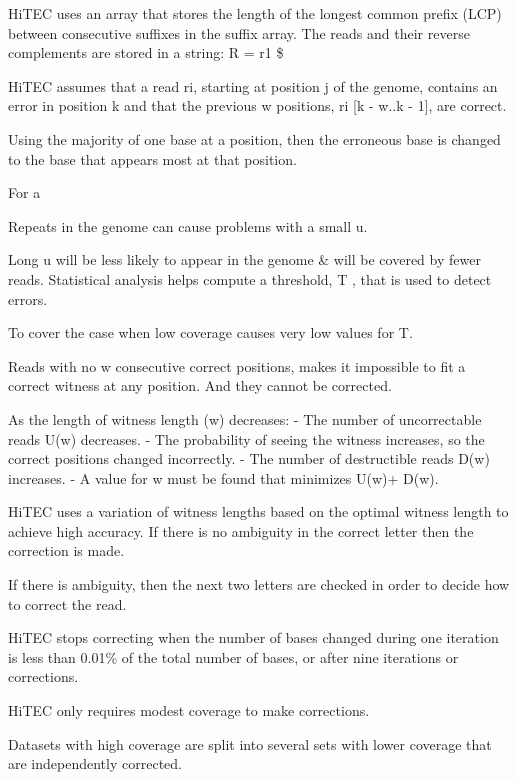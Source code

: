 \documentclass{llncs}
\begin{document}
HiTEC uses an array that stores the length of the longest common prefix (LCP) between consecutive suffixes in the suffix array.
The reads and their reverse complements are stored in a string:
R = r1 \$ %

HiTEC assumes that a read ri, starting at position j of the genome, contains an error in position k and that the previous w positions, ri [k - w..k - 1], are correct. 

Using the majority of one base at a position, then the erroneous base is changed to the base that appears most at that position. 

For a %

Repeats in the genome can cause problems with a small u.

Long u will be less likely to appear in the genome \& will be covered by fewer reads.
Statistical analysis helps compute a threshold, T , that is used to detect errors. 

To cover the case when low coverage causes very low values for T.

Reads with no w consecutive correct positions, makes it impossible to fit a correct witness at any position. And they cannot be corrected.

As the length of witness length (w) decreases:
- The number of uncorrectable reads U(w) decreases.
- The probability of seeing the witness increases, so the correct positions changed incorrectly. 
- The number of destructible reads D(w) increases.
- A value for w must be found that minimizes U(w)+ D(w). 

HiTEC uses a variation of witness lengths based on the optimal witness length to achieve high accuracy.
If there is no ambiguity in the correct letter then the correction is made.

If there is ambiguity, then the next two letters are checked in order to decide how to correct the read.

HiTEC stops correcting when the number of bases changed during one iteration is less than 0.01\% of the total number of bases, or after nine iterations or corrections.

HiTEC only requires modest coverage to make corrections.

Datasets with high coverage are split into several sets with lower coverage that are independently corrected. 
\end{document}
